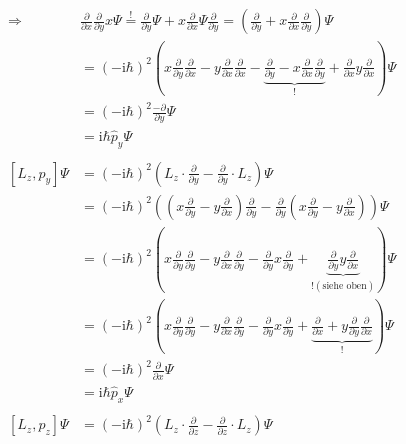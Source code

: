 \begin{align*}
        \Rightarrow&\frac{\partial}{\partial x} \frac{\partial}{\partial y} x\Psi \stackrel{!}{=} \frac{\partial}{\partial y}\Psi + x\frac{\partial}{\partial x}\Psi \frac{\partial}{\partial y} = \left( \frac{\partial}{\partial y} + x\frac{\partial}{\partial x} \frac{\partial}{\partial y} \right) \Psi\\
        &= \left( -\text{i}\hbar \right)^2 \left( x\frac{\partial}{\partial y}\frac{\partial}{\partial x} - y\frac{\partial}{\partial x}\frac{\partial}{\partial x} - \underbrace{\frac{\partial}{\partial y} - x\frac{\partial}{\partial x} \frac{\partial}{\partial y}}_{!} + \frac{\partial}{\partial x}y \frac{\partial}{\partial x} \right)\Psi\\
        &= \left( -\text{i}\hbar \right)^2 \frac{-\partial}{\partial y}\Psi\\
        &= \text{i}\hbar \hat{p}_y \Psi\\
        \\
        \left[ L_z,p_y \right]\Psi &= \left( -\text{i}\hbar \right)^2 \left( L_z\cdot \frac{\partial}{\partial y} - \frac{\partial}{\partial y} \cdot L_z \right) \Psi\\
        &= \left( -\text{i}\hbar \right)^2 \left( \left( x\frac{\partial}{\partial y} - y\frac{\partial}{\partial x} \right) \frac{\partial}{\partial y} - \frac{\partial}{\partial y} \left( x\frac{\partial}{\partial y} - y\frac{\partial}{\partial x} \right) \right)\Psi\\
        &= \left( -\text{i}\hbar \right)^2 \left( x\frac{\partial}{\partial y} \frac{\partial}{\partial y} - y\frac{\partial}{\partial x} \frac{\partial}{\partial y} - \frac{\partial}{\partial y} x\frac{\partial}{\partial y} + \underbrace{\frac{\partial}{\partial y} y\frac{\partial}{\partial x}}_{! (\text{siehe oben})} \right)\Psi\\
        &= \left( -\text{i}\hbar \right)^2 \left( x\frac{\partial}{\partial y} \frac{\partial}{\partial y} - y\frac{\partial}{\partial x} \frac{\partial}{\partial y} - \frac{\partial}{\partial y} x\frac{\partial}{\partial y} + \underbrace{\frac{\partial}{\partial x} + y\frac{\partial}{\partial y} \frac{\partial}{\partial x}}_{!} \right)\Psi\\
        &= \left( -\text{i}\hbar \right)^2 \frac{\partial}{\partial x}\Psi\\
        &= \text{i}\hbar \hat{p}_x \Psi\\
        \\
        \left[ L_z,p_z \right]\Psi &= \left( -\text{i}\hbar \right)^2 \left( L_z\cdot \frac{\partial}{\partial z} - \frac{\partial}{\partial z} \cdot L_z \right)\Psi\\

\end{align*}
